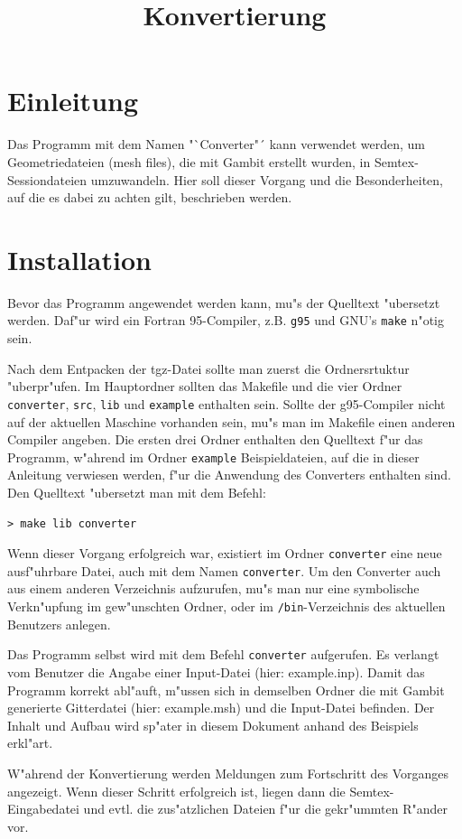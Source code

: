 \documentclass{article}
\title{Konvertierung}
\begin{document}
\section{Einleitung}

Das Programm mit dem Namen "`Converter"´ kann verwendet werden, um Geometriedateien (mesh files), die mit Gambit erstellt wurden, in Semtex- Sessiondateien umzuwandeln. Hier soll dieser Vorgang und die Besonderheiten, auf die es dabei zu achten gilt, beschrieben werden.

\section{Installation}

Bevor das Programm angewendet werden kann, mu"s der Quelltext "ubersetzt werden. Daf"ur wird ein Fortran 95-Compiler, z.B. \verb|g95| und GNU's \verb|make| n"otig sein. 

Nach dem Entpacken der tgz-Datei sollte man zuerst die Ordnersrtuktur "uberpr"ufen. Im Hauptordner sollten das Makefile und die vier Ordner \verb|converter|, \verb|src|, \verb|lib| und \verb|example| enthalten sein. Sollte der g95-Compiler nicht auf der aktuellen Maschine vorhanden sein, mu"s man im Makefile einen anderen Compiler angeben. Die ersten drei Ordner enthalten den Quelltext f"ur das Programm, w"ahrend im Ordner \verb|example| Beispieldateien, auf die in dieser Anleitung verwiesen werden, f"ur die Anwendung des Converters enthalten sind. Den Quelltext "ubersetzt man mit dem Befehl:

\begin{verbatim}
> make lib converter
\end{verbatim}

Wenn dieser Vorgang erfolgreich war, existiert im Ordner \verb|converter| eine neue ausf"uhrbare Datei, auch mit dem Namen \verb|converter|. Um den Converter auch aus einem anderen Verzeichnis aufzurufen, mu"s man nur eine symbolische Verkn"upfung im gew"unschten Ordner, oder im \verb|/bin|-Verzeichnis des aktuellen Benutzers anlegen.

Das Programm selbst wird mit dem Befehl \verb|converter| aufgerufen. Es verlangt vom Benutzer die Angabe einer Input-Datei (hier: example.inp). Damit das Programm korrekt abl"auft, m"ussen sich in demselben Ordner die mit Gambit generierte Gitterdatei (hier: example.msh) und die Input-Datei befinden. Der Inhalt und Aufbau wird sp"ater in diesem Dokument anhand des Beispiels erkl"art.

W"ahrend der Konvertierung werden Meldungen zum Fortschritt des Vorganges angezeigt. Wenn dieser Schritt erfolgreich ist, liegen dann die Semtex-Eingabedatei und evtl. die zus"atzlichen Dateien f"ur die gekr"ummten R"ander vor.
\end{document}
